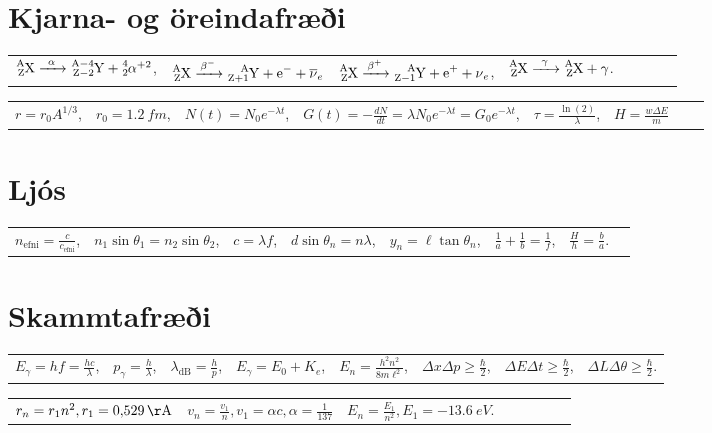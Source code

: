 \section*{Kjarna- og öreindafræði}

\begin{table}[H]
\begin{tabular}{llllllll}
$\ce{^{A}_{Z}X ->[\alpha] ^{A-4}_{Z-2}Y + ^{4}_{2}\alpha}^{+2}$, & $\ce{^{A}_{Z}X ->[\beta^-] ^{A}_{Z+1}Y + e^{-} + \overline{\nu}_e}$ & $\ce{^{A}_{Z}X ->[\beta^+] ^{A}_{Z-1}Y + e^{+} + \nu_e}$, & $\ce{^{A}_{Z}X ->[\gamma] ^{A}_{Z}X + \gamma}$.
\end{tabular}
\end{table}

\begin{table}[H]
\begin{tabular}{llllllll}
$r = r_0 A^{1/3}$, & $r_0 = \SI{1.2}{fm}$, & $N(t) = N_0e^{-\lambda t}$, & $G(t) = -\frac{dN}{dt} = \lambda N_0e^{-\lambda t} = G_0 e^{-\lambda t}$, & $\tau = \frac{\ln(2)}{\lambda}$, & $H = \frac{w\Delta E}{m}$
\end{tabular}
\end{table}


\section*{Ljós}

\begin{table}[H]
\begin{tabular}{llllllll}
$n_{\text{efni}} = \frac{c}{c_{\text{efni}}}$, & $n_1 \sin\theta_1 = n_2\sin\theta_2$, & $c = \lambda f$, & $d\sin\theta_n = n\lambda$, & $y_n = \ell \tan\theta_n$, & $\frac{1}{a} + \frac{1}{b} = \frac{1}{f}$, & $\frac{H}{h} = \frac{b}{a}$. 
\end{tabular}
\end{table}

\section*{Skammtafræði}

\begin{table}[H]
\begin{tabular}{llllllll}
$E_{\gamma} = hf = \frac{hc}{\lambda}$, & $p_{\gamma} = \frac{h}{\lambda}$, & $\lambda_{\text{dB}} = \frac{h}{p}$, & $E_\gamma = E_0 + K_e$, & $E_n = \frac{h^2 n^2}{8m\ell^2}$, & $\Delta x \Delta p \geq \frac{\hbar}{2}$, &  $\Delta E \Delta t \geq \frac{\hbar}{2}$, & $\Delta L \Delta \theta \geq \frac{\hbar}{2}$.
\end{tabular}
\end{table}

\begin{table}[H]
\begin{tabular}{llllllll}
$r_n = r_1 n^2, r_1 = \SI{0.529}{\AA}$ & $v_n = \frac{v_1}{n}, v_1 = \alpha c, \alpha = \frac{1}{137}$ & $E_n = \frac{E_1}{n^2}, E_1 = -\SI{13.6}{eV}$.
\end{tabular}
\end{table}

\newpage